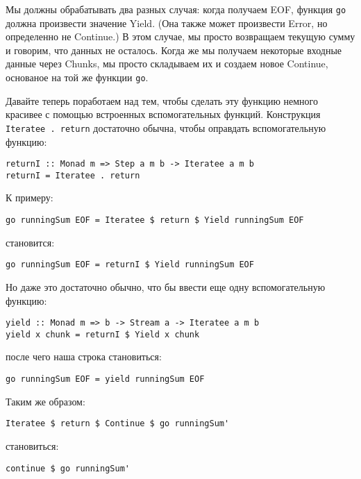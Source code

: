 Мы должны обрабатывать два разных случая: когда получаем EOF, функция \lstinline'go' должна произвести значение Yield. (Она также может произвести Error, но определенно не Continue.) В этом случае, мы просто возвращаем текущую сумму и говорим, что данных не осталось. Когда же мы получаем некоторые входные данные через Chunks, мы просто складываем их и создаем новое Continue, основаное на той же функции \lstinline'go'.

Давайте теперь поработаем над тем, чтобы сделать эту функцию немного красивее с помощью встроенных вспомогательных функций. Конструкция \lstinline'Iteratee . return' достаточно обычна, чтобы оправдать вспомогательную функцию:

\begin{lstlisting}
returnI :: Monad m => Step a m b -> Iteratee a m b
returnI = Iteratee . return
\end{lstlisting}

К примеру:

\begin{lstlisting}
go runningSum EOF = Iteratee $ return $ Yield runningSum EOF
\end{lstlisting}%

становится:

\begin{lstlisting}
go runningSum EOF = returnI $ Yield runningSum EOF
\end{lstlisting}%

Но даже это достаточно обычно, что бы ввести еще одну вспомогательную функцию:

\begin{lstlisting}
yield :: Monad m => b -> Stream a -> Iteratee a m b
yield x chunk = returnI $ Yield x chunk
\end{lstlisting}%

после чего наша строка становиться:

\begin{lstlisting}
go runningSum EOF = yield runningSum EOF
\end{lstlisting}

Таким же образом:

\begin{lstlisting}
Iteratee $ return $ Continue $ go runningSum'
\end{lstlisting}%

становиться:

\begin{lstlisting}
continue $ go runningSum'
\end{lstlisting}%

